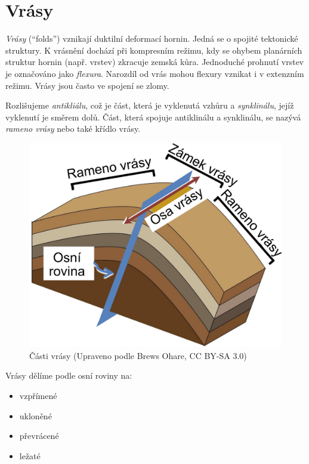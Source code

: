 \section{Vrásy}
\emph{Vrásy} (\enquote{folds}) vznikají duktilní deformací hornin. Jedná se o spojité tektonické struktury. K vrásnění dochází při kompresním režimu, kdy se ohybem planárních struktur hornin (např. vrstev) zkracuje zemská kůra. Jednoduché prohnutí vrstev je označováno jako \emph{flexura}. Narozdíl od vrás mohou flexury vznikat i v extenzním režimu. Vrásy jsou často ve spojení se zlomy.

Rozlišujeme \emph{antikliálu}, což je část, která je vyklenutá vzhůru a \emph{synklinálu}, jejíž vyklenutí je směrem dolů. Část, která spojuje antiklinálu a synklinálu, se nazývá \emph{rameno vrásy} nebo také křídlo vrásy.

\begin{figure}[h]
	\centering
	\includegraphics[width=\linewidth]{obrazky/tectonic/fold_parts}
	\caption{Části vrásy (Upraveno podle Brews Ohare, CC BY-SA 3.0)}
	\label{fig:foldparts}
\end{figure}

Vrásy dělíme podle osní roviny na:

\begin{itemize}
	\item vzpřímené
	\item ukloněné
	\item převrácené
	\item ležaté
\end{itemize}

